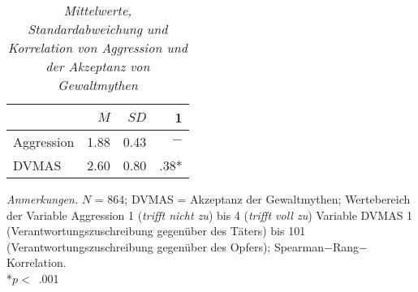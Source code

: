 \begin{table}[htb]
    \caption[Mittelwerte, Standardabweichung und Korrelation von Aggression und der Akzeptanz von Gewaltmythen]{\textit {Mittelwerte, Standardabweichung und Korrelation von Aggression und der Akzeptanz von Gewaltmythen}} 
    \label{H2_Pearson}
    \centering
    \begin{adjustbox}{width=5.5cm} %
    \small
    \begin{tabular}{lrrr}
      \hline
        & $M$   & $SD$ & 1 \\
      \hline
    Aggression      & 1.88 & 0.43  & $-$      \\
    DVMAS           & 2.60 & 0.80  & .38*      \\
       \hline
    \end{tabular}
    \end{adjustbox}
    
    \begin{tablenotes}
        \item \textit{Anmerkungen.} \( N \) = 864; DVMAS = Akzeptanz der Gewaltmythen; Wertebereich der Variable Aggression 1 (\textit{trifft nicht zu}) bis 4 (\textit{trifft voll zu}) Variable DVMAS 1 (Verantwortungszuschreibung gegenüber des Täters) bis 101 (Verantwortungszuschreibung gegenüber des Opfers); Spearman$-$Rang$-$Korrelation. \\ *$p<$~.001
      \end{tablenotes}
    \end{table}

